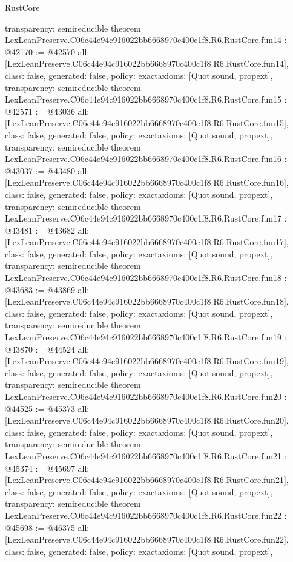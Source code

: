 \begin{lexlean}{RustCore}
\begin{coremodule}
{  transparency: semireducible
}
theorem LexLeanPreserve.C06c44e94c916022bb6668970c400c1f8.R6.RustCore.fun14 : @42170 := @42570 {
  all: [LexLeanPreserve.C06c44e94c916022bb6668970c400c1f8.R6.RustCore.fun14],
  class: false,
  generated: false,
  policy: exact{axioms: [Quot.sound, propext]},
  transparency: semireducible
}
theorem LexLeanPreserve.C06c44e94c916022bb6668970c400c1f8.R6.RustCore.fun15 : @42571 := @43036 {
  all: [LexLeanPreserve.C06c44e94c916022bb6668970c400c1f8.R6.RustCore.fun15],
  class: false,
  generated: false,
  policy: exact{axioms: [Quot.sound, propext]},
  transparency: semireducible
}
theorem LexLeanPreserve.C06c44e94c916022bb6668970c400c1f8.R6.RustCore.fun16 : @43037 := @43480 {
  all: [LexLeanPreserve.C06c44e94c916022bb6668970c400c1f8.R6.RustCore.fun16],
  class: false,
  generated: false,
  policy: exact{axioms: [Quot.sound, propext]},
  transparency: semireducible
}
theorem LexLeanPreserve.C06c44e94c916022bb6668970c400c1f8.R6.RustCore.fun17 : @43481 := @43682 {
  all: [LexLeanPreserve.C06c44e94c916022bb6668970c400c1f8.R6.RustCore.fun17],
  class: false,
  generated: false,
  policy: exact{axioms: [Quot.sound, propext]},
  transparency: semireducible
}
theorem LexLeanPreserve.C06c44e94c916022bb6668970c400c1f8.R6.RustCore.fun18 : @43683 := @43869 {
  all: [LexLeanPreserve.C06c44e94c916022bb6668970c400c1f8.R6.RustCore.fun18],
  class: false,
  generated: false,
  policy: exact{axioms: [Quot.sound, propext]},
  transparency: semireducible
}
theorem LexLeanPreserve.C06c44e94c916022bb6668970c400c1f8.R6.RustCore.fun19 : @43870 := @44524 {
  all: [LexLeanPreserve.C06c44e94c916022bb6668970c400c1f8.R6.RustCore.fun19],
  class: false,
  generated: false,
  policy: exact{axioms: [Quot.sound, propext]},
  transparency: semireducible
}
theorem LexLeanPreserve.C06c44e94c916022bb6668970c400c1f8.R6.RustCore.fun20 : @44525 := @45373 {
  all: [LexLeanPreserve.C06c44e94c916022bb6668970c400c1f8.R6.RustCore.fun20],
  class: false,
  generated: false,
  policy: exact{axioms: [Quot.sound, propext]},
  transparency: semireducible
}
theorem LexLeanPreserve.C06c44e94c916022bb6668970c400c1f8.R6.RustCore.fun21 : @45374 := @45697 {
  all: [LexLeanPreserve.C06c44e94c916022bb6668970c400c1f8.R6.RustCore.fun21],
  class: false,
  generated: false,
  policy: exact{axioms: [Quot.sound, propext]},
  transparency: semireducible
}
theorem LexLeanPreserve.C06c44e94c916022bb6668970c400c1f8.R6.RustCore.fun22 : @45698 := @46375 {
  all: [LexLeanPreserve.C06c44e94c916022bb6668970c400c1f8.R6.RustCore.fun22],
  class: false,
  generated: false,
  policy: exact{axioms: [Quot.sound, propext]},
}
\end{coremodule}
\end{lexlean}
